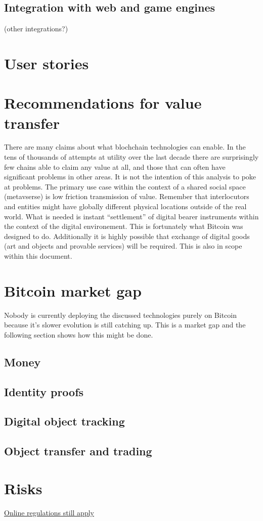 \subsection{Integration with web and game engines} (other integrations?) 
\section{User stories}
\section{Recommendations for value transfer}
There are many claims about what blochchain technologies can enable. In the tens of thousands of attempts at utility over the last decade there are surprisingly few chains able to claim any value at all, and those that can often have significant problems in other areas. It is not the intention of this analysis to poke at problems. The primary use case within the context of a shared social space (metavserse) is low friction transmission of value. Remember that interlocutors and entities might have globally different physical locations outside of the real world. What is needed is instant ``settlement'' of digital bearer instruments within the context of the digital environement. This is fortunately what Bitcoin was designed to do. Additionally it is highly possible that exchange of digital goods (art and objects and provable services) will be required. This is also in scope within this document.
\section{Bitcoin market gap}
Nobody is currently deploying the discussed technologies purely on Bitcoin because it's slower evolution is still catching up. This is a market gap and the following section shows how this might be done.
\subsection{Money}
\subsection{Identity proofs}
\subsection{Digital object tracking}
\subsection{Object transfer and trading}
\section{Risks}
\href{https://www.carnegieuktrust.org.uk/blog-posts/regulating-the-future-the-online-safety-bill-and-the-metaverse/}{Online regulations still apply}